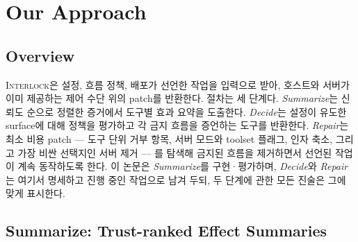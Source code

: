 \documentclass[acmsmall,screen,review,anonymous]{acmart}
\begin{document}
\section{Our Approach}
\label{sec:approach}

\subsection{Overview}

\textsc{Interlock}은 설정, 흐름 정책, 배포가 선언한 작업을 입력으로 받아, 호스트와 서버가 이미 제공하는 제어 수단 위의 patch를 반환한다. 절차는 세 단계다. \emph{Summarize}는 신뢰도 순으로 정렬한 증거에서 도구별 효과 요약을 도출한다. \emph{Decide}는 설정이 유도한 surface에 대해 정책을 평가하고 각 금지 흐름을 증언하는 도구를 반환한다. \emph{Repair}는 최소 비용 patch --- 도구 단위 거부 항목, 서버 모드와 toolset 플래그, 인자 축소, 그리고 가장 비싼 선택지인 서버 제거 --- 를 탐색해 금지된 흐름을 제거하면서 선언된 작업이 계속 동작하도록 한다. 이 논문은 \emph{Summarize}를 구현·평가하며, \emph{Decide}와 \emph{Repair}는 여기서 명세하고 진행 중인 작업으로 남겨 두되, 두 단계에 관한 모든 진술은 그에 맞게 표시한다.

\subsection{Summarize: Trust-ranked Effect Summaries}
\end{document}
